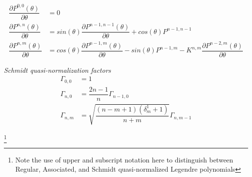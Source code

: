 \begin{equation} \label{eq:dLegendre_Recursive}
\begin{aligned}
\dfrac{\partial P^{0,0}(\theta)}{\partial \theta} &= 0\\
\dfrac{\partial P^{n,n}(\theta)}{\partial \theta} &= sin(\theta)\dfrac{\partial P^{n-1,n-1}(\theta)}{\partial \theta} + cos(\theta)P^{n-1,n-1}\\
\dfrac{\partial P^{n,m}(\theta)}{\partial \theta} &= cos(\theta)\dfrac{\partial P^{n-1,m}(\theta)}{\partial \theta} - sin(\theta)P^{n-1,m} - K^{n,m}\dfrac{\partial P^{n-2,m}(\theta)}{\partial \theta}
\end{aligned}
\end{equation}


{\it Schmidt quasi-normalization factors}
\begin{equation}
\begin{aligned}
\Gamma_{0,0} &= 1\\
\Gamma_{n,0} &= \dfrac{2n-1}{n}\Gamma_{n-1,0}\\
\Gamma_{n,m} &= \sqrt{\dfrac{(n-m+1)(\delta_m^1+1)}{n+m}}\Gamma_{n,m-1}
\end{aligned}
\end{equation}


\footnote{Note the use of upper and subscript notation here to distinguish between Regular, Associated, and Schmidt quasi-normalized Legendre polynomials}

